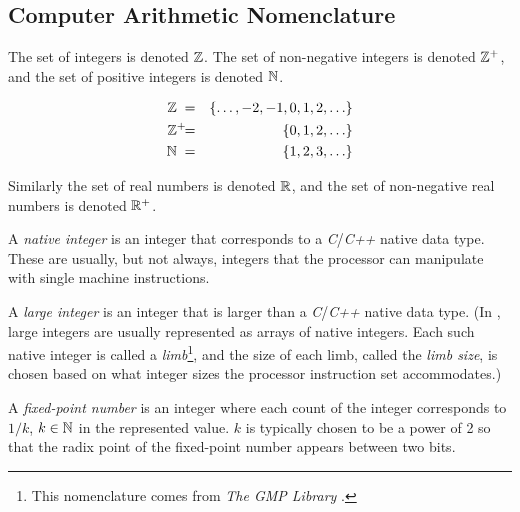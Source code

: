 \subsection{Computer Arithmetic Nomenclature}
\label{ciov0:snom0:scan0}

The set of integers is denoted 
${\mathbb{Z}}{}$\@.  The set of 
non-negative integers is denoted 
${\mathbb{Z}^+}{}$, and 
the set of positive integers is denoted 
${\mathbb{N}}{}$.  

\begin{eqnarray}
\label{eq:ciov0:snom0:scan0:01}
{\mathbb{Z}}{}   \;    & = & \{ \ldots , -2, -1, 0, 1, 2, \ldots \} \\
\label{eq:ciov0:snom0:scan0:02}
{\mathbb{Z}^+}{} \!\!\!\!\; & = & \{ 0, 1, 2, \ldots \}         \\
\label{eq:ciov0:snom0:scan0:03}
{\mathbb{N}}{}  \;  & = & \{ 1, 2, 3, \ldots \}
\end{eqnarray}

Similarly the set of real numbers is denoted 
${\mathbb{R}}$, and the set of non-negative real 
numbers is denoted ${\mathbb{R}^+}$.  

A \emph{native integer} is an integer that 
corresponds to a \emph{C}/\emph{C++} native data type.  These are usually, 
but not always, integers that the processor can manipulate with single 
machine instructions.  

A \emph{large integer} is an integer that is larger 
than a \emph{C}/\emph{C++} native data type.  (In 
\emph{\productbasenameshort{}}, large integers are usually represented as 
arrays of native integers.  Each such native integer is called a 
\emph{limb}\footnote{This nomenclature comes from \emph{The GMP Library} 
\cite{bibref:w:gmplibhomepage}.}, and the size of each limb, called the 
\emph{limb size}, is chosen based on what integer sizes 
the processor instruction set accommodates.) 

A \emph{fixed-point number} is an integer where 
each count of the integer corresponds to $1/k$, $k \in {\mathbb{N}}$ in 
the represented value.  $k$ is typically chosen to be a power of 2 so that 
the radix point of the fixed-point number appears between two bits.  

